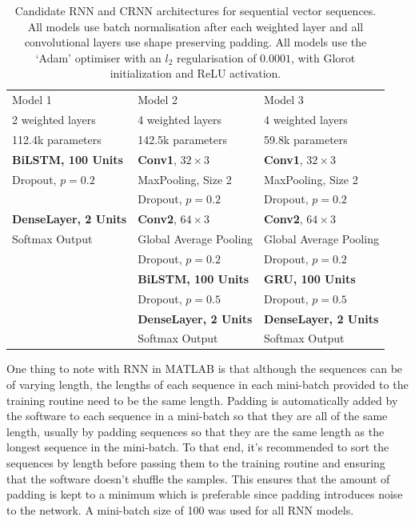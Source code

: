 \begin{table}[ht]
\begin{center}
\begin{tabular}{l l l}
\toprule
Model 1 & Model 2 & Model 3 \\ [0.5ex]
2 weighted layers & 4 weighted layers & 4 weighted layers \\[0.5ex]
112.4k parameters & 142.5k parameters & 59.8k parameters \\[0.5ex]
\midrule
\textbf{BiLSTM, 100 Units} & \textbf{Conv1}, $32 \times 3$ & \textbf{Conv1}, $32 \times 3$ \\
Dropout, $p=0.2$ & MaxPooling, Size 2 & MaxPooling, Size 2 \\
& Dropout, $p=0.2$ & Dropout, $p=0.2$ \\[1ex]
\textbf{DenseLayer, 2 Units} & \textbf{Conv2}, $64 \times 3$ & \textbf{Conv2}, $64 \times 3$ \\
Softmax Output & Global Average Pooling & Global Average Pooling \\
& Dropout, $p=0.2$ & Dropout, $p=0.2$ \\[1ex]
& \textbf{BiLSTM, 100 Units} & \textbf{GRU, 100 Units} \\
& Dropout, $p=0.5$  & Dropout, $p=0.5$  \\[1ex]
& \textbf{DenseLayer, 2 Units} & \textbf{DenseLayer, 2 Units} \\
& Softmax Output & Softmax Output \\
\bottomrule
\end{tabular}
\caption{Candidate RNN and CRNN architectures for sequential vector sequences.
  All models use batch normalisation after each weighted layer and all
  convolutional layers use shape preserving padding. All models use the `Adam'
  optimiser with an $l_2$ regularisation of $0.0001$, with Glorot initialization
and ReLU activation.}\label{table:rnn_seq_vector}
\end{center}
\end{table}

One thing to note with RNN in MATLAB is that although the sequences can
be of varying length, the lengths of each sequence in each mini-batch provided
to the training routine need to be the same length. Padding is automatically
added by the software to each sequence in a mini-batch so that they are all of
the same length, usually by padding sequences so that they are the same length
as the longest sequence in the mini-batch. To that end, it's recommended to sort
the sequences by length before passing them to the training routine and ensuring
that the software doesn't shuffle the samples. This ensures that the amount of
padding is kept to a minimum which is preferable since padding introduces noise
to the network. A mini-batch size of 100 was used for all RNN models.

